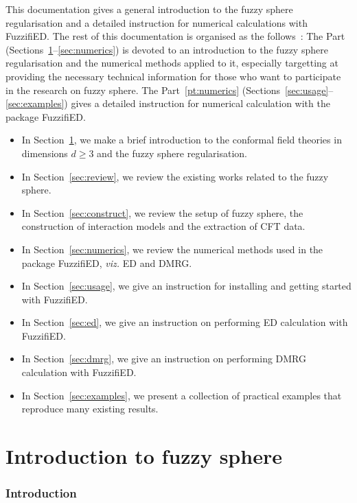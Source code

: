 \documentclass{timesjhep}
\begin{document}
This documentation gives a general introduction to the fuzzy sphere regularisation and a detailed instruction for numerical calculations with FuzzifiED. The rest of this documentation is organised as the follows~: The Part~\ref{pt:intro} (Sections~\ref{sec:intro}--\ref{sec:numerics}) is devoted to an introduction to the fuzzy sphere regularisation and the numerical methods applied to it, especially targetting at providing the necessary technical information for those who want to participate in the research on fuzzy sphere. The Part~\ref{pt:numerics} (Sections~\ref{sec:usage}--\ref{sec:examples}) gives a detailed instruction for numerical calculation with the package FuzzifiED. 
\begin{itemize}
    \item In Section~\ref{sec:intro}, we make a brief introduction to the conformal field theories in dimensions $d\ge 3$ and the fuzzy sphere regularisation. 
    \item In Section~\ref{sec:review}, we review the existing works related to the fuzzy sphere. 
    \item In Section~\ref{sec:construct}, we review the setup of fuzzy sphere, the construction of interaction models and the extraction of CFT data.
    \item In Section~\ref{sec:numerics}, we review the numerical methods used in the package FuzzifiED, \textit{viz.} ED and DMRG. 
    \item In Section~\ref{sec:usage}, we give an instruction for installing and getting started with FuzzifiED. 
    \item In Section~\ref{sec:ed}, we give an instruction on performing ED calculation with FuzzifiED. 
    \item In Section~\ref{sec:dmrg}, we give an instruction on performing DMRG calculation with FuzzifiED. 
    \item In Section~\ref{sec:examples}, we present a collection of practical examples that reproduce many existing results.
\end{itemize}

\clearpage
\part{Introduction to fuzzy sphere}
\label{pt:intro}

\section{Introduction}
\label{sec:intro}
\end{document}
